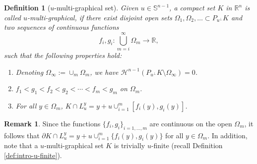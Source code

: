 \documentclass[11pt]{article}
\newtheorem{defn}[thm]{Definition}
\theoremstyle{definition}
\newtheorem{rem}[thm]{\textbf{Remark}}
\theoremstyle{proof}
\DeclareMathOperator{\+}{\mathop{\tilde{+}}}
\newcommand{\R}{\mathbb{R}}
\renewcommand{\S}{\mathbb{S}}
\renewcommand{\H}{\mathcal{H}}
\numberwithin{equation}{section}
\numberwithin{equation}{section}
\begin{document}
\begin{defn}[$u$-multi-graphical set] \label{def:mgs} Given $u \in \S^{n-1}$, a compact set $K$ in $\R^n$ is called $u$-multi-graphical, if there exist disjoint open sets $\Omega_1, \Omega_2,\ldots \subset P_{u^{\perp}} K$ and two sequences of
continuous functions
\[
f_i, g_i : \bigcup_{m=i}^\infty \Omega_ m \rightarrow \R ,
\]
such that the following properties hold: \begin{enumerate}
\item \label{it:mgs-1} Denoting $\Omega_\infty := \cup_m \Omega_m$, we have $\H^{n-1}(P_{u^\perp} K \setminus \Omega_\infty) = 0$. 
\item $f_1 < g_1 < f_2 < g_2 < \cdots < f_m < g_m$ on $\Omega_m$. 
\item \label{it:mgs-3} For all $y \in \Omega_m$, $K \cap L_u^y = y + u \cup_{i=1}^m [f_i(y),g_i(y)]$. 
\end{enumerate}
\end{defn}

\begin{rem} \label{rem:mgs}
Since the functions $\{f_i,g_i\}_{i=1,\ldots,m}$ are continuous on the open $\Omega_m$, it follows that $\partial K \cap L_u^y = y + u \cup_{i=1}^m \{f_i(y),g_i(y)\}$ for all $y \in \Omega_m$. In addition, note that a $u$-multi-graphical set $K$ is trivially $u$-finite (recall Definition \ref{def:intro-u-finite}). 
\end{rem}
\end{document}

